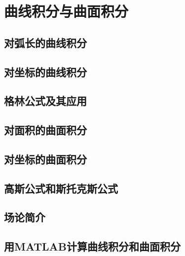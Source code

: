 \chapter{曲线积分与曲面积分}\label{cha:10}

\section{对弧长的曲线积分}

\section{对坐标的曲线积分}

\section{格林公式及其应用}

\section{对面积的曲面积分}

\section{对坐标的曲面积分}

\section{高斯公式和斯托克斯公式}

\section{场论简介}

\section{用MATLAB计算曲线积分和曲面积分}